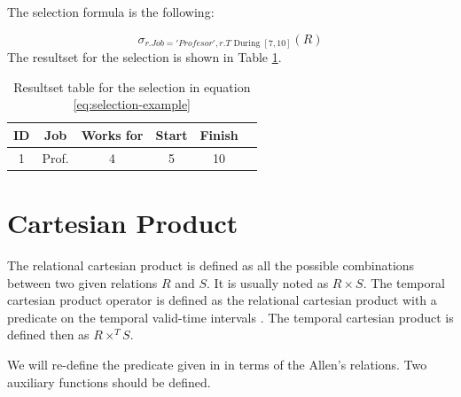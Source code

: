 \documentclass{llncs}
\begin{document}
\begin{example}
\begin{table}


\end{table}


The selection formula is the following:

\begin{equation}
 \label{eq:selection-example}
\sigma_{r.Job = 'Profesor', r.T \mbox{ During } \left[7, 10\right]} \left(R \right)
\end{equation}
The resultset for the selection is shown in Table \ref{table:example-selection}.
\end{example}


\begin{table}
\centering
\caption{Resultset table for the selection in equation \eqref{eq:selection-example}}

\begin{tabular}{c c c c c c }
\hline
ID & Job & Works for & Start & Finish \\ \hline
1 & Prof. & 4 & 5 & 10 \\
\hline 
\end{tabular}
\label{table:example-selection}



\end{table}







\section{\label{sec:cartesian-product}Cartesian Product}
The relational cartesian product is defined as all the possible combinations between two given relations $R$ and $S$. It is usually noted as $R \times S$.
The temporal cartesian product operator is defined as the relational cartesian product with a predicate on the temporal valid-time intervals \cite{DengfengGao2002}. The temporal cartesian product is defined then as $R \times^T S$.

We will re-define the predicate given in \cite{DengfengGao2002} in terms of the Allen's relations. Two auxiliary functions should be defined.
\end{document}
